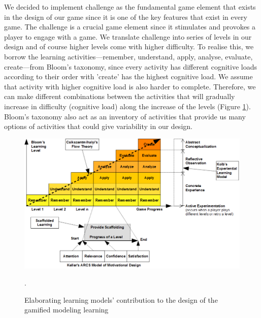 \documentclass[12pt, a4paper]{report}
\begin{document}
{We decided to implement challenge as the fundamental game element that exists in the design of our game since it is one of the key features that exist in every game. The challenge is a crucial game element since it stimulates and provokes a player to engage with a game. We translate challenge into series of levels in our design and of course higher levels come with higher difficulty. To realise this, we borrow the learning activities---remember, understand, apply, analyse, evaluate, create---from Bloom's taxonomy, since every activity has different cognitive loads according to their order with 'create' has the highest cognitive load. We assume that activity with higher cognitive load is also harder to complete. Therefore, we can make different combinations between the activities that will gradually increase in difficulty (cognitive load) along the increase of the levels (Figure \ref{learning-models}). Bloom's taxonomy also act as an inventory of activities that provide us many options of activities that could give variability in our design. 

\begin{figure}[ht]
\centering
\includegraphics[width=\textwidth]{learning-models}
\caption{Elaborating learning models' contribution to the design of the gamified modeling learning}.
\label{learning-models}
\end{figure}

}
\end{document}
